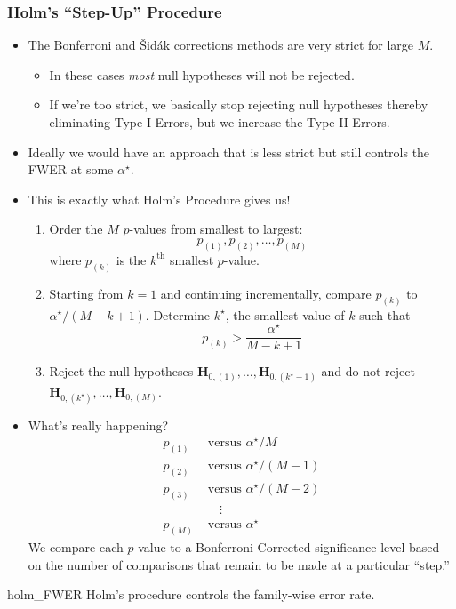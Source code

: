 \subsubsection*{Holm's ``Step-Up'' Procedure}
\begin{itemize}
    \item The Bonferroni and Šidák corrections methods are very strict for large $M$.
          \begin{itemize}
              \item In these cases \emph{most} null hypotheses will not be rejected.
              \item If we're too strict, we basically stop rejecting null hypotheses thereby
                    eliminating Type I Errors, but we increase the Type II Errors.
          \end{itemize}
    \item Ideally we would have an approach that is less strict but still controls the FWER at some $ \alpha^\star $.
    \item This is exactly what Holm's Procedure gives us!
          \begin{framed}
              \begin{enumerate}
                  \item Order the $M$ $p$-values from smallest to largest:
                        \[ p_{(1)},p_{(2)},\ldots,p_{(M)} \]
                        where $ p_{(k)} $ is the $ k^{\text{th}} $ smallest $ p $-value.
                  \item Starting from $ k=1 $ and continuing incrementally, compare
                        $ p_{(k)} $ to $ \alpha^\star/(M-k+1) $. Determine $ k^\star $,
                        the smallest value of $ k $ such that
                        \[ p_{(k)}>\frac{\alpha^\star}{M-k+1} \]
                  \item Reject the null hypotheses $ \mathbf{H}_{0,(1)},\ldots,\mathbf{H}_{0,(k^\star-1)} $
                        and do not reject $ \mathbf{H}_{0,(k^\star)},\ldots,\mathbf{H}_{0,(M)} $.
              \end{enumerate}
          \end{framed}
    \item What's really happening?
          \begin{align*}
              p_{(1)} & \text{ versus } \alpha^\star/M     \\
              p_{(2)} & \text{ versus } \alpha^\star/(M-1) \\
              p_{(3)} & \text{ versus } \alpha^\star/(M-2) \\
                      & \quad\;\vdots                      \\
              p_{(M)} & \text{ versus } \alpha^\star
          \end{align*}
          We compare each $ p $-value to a Bonferroni-Corrected significance
          level based on the number of comparisons that remain to be
          made at a particular ``step.''
\end{itemize}
\begin{Theorem}{}{holm_FWER}
    Holm's procedure controls the family-wise error rate.
\end{Theorem}

